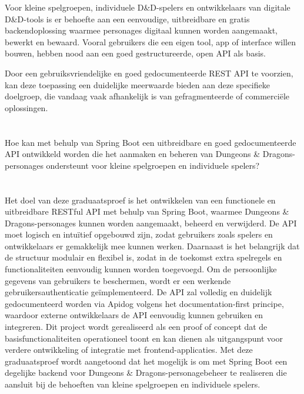 Voor kleine spelgroepen, individuele D\&D-spelers en ontwikkelaars van digitale D&D-tools is er behoefte aan een eenvoudige, uitbreidbare en gratis backendoplossing waarmee personages digitaal kunnen worden aangemaakt, bewerkt en bewaard. Vooral gebruikers die een eigen tool, app of interface willen bouwen, hebben nood aan een goed gestructureerde, open API als basis.

Door een gebruiksvriendelijke en goed gedocumenteerde REST API te voorzien, kan deze toepassing een duidelijke meerwaarde bieden aan deze specifieke doelgroep, die vandaag vaak afhankelijk is van gefragmenteerde of commerciële oplossingen.

\section{}%
\label{sec:onderzoeksvraag}

Hoe kan met behulp van Spring Boot een uitbreidbare en goed gedocumenteerde API ontwikkeld worden die het aanmaken en beheren van Dungeons \& Dragons-personages ondersteunt voor kleine spelgroepen en individuele spelers?

\section{}%
\label{sec:onderzoeksdoelstelling}

Het doel van deze graduaatsproef is het ontwikkelen van een functionele en uitbreidbare RESTful API met behulp van Spring Boot, waarmee Dungeons & Dragons-personages kunnen worden aangemaakt, beheerd en verwijderd. De API moet logisch en intuïtief opgebouwd zijn, zodat gebruikers zoals spelers en ontwikkelaars er gemakkelijk mee kunnen werken. Daarnaast is het belangrijk dat de structuur modulair en flexibel is, zodat in de toekomst extra spelregels en functionaliteiten eenvoudig kunnen worden toegevoegd. Om de persoonlijke gegevens van gebruikers te beschermen, wordt er een werkende gebruikersauthenticatie geïmplementeerd. De API zal volledig en duidelijk gedocumenteerd worden via Apidog volgens het documentation-first principe, waardoor externe ontwikkelaars de API eenvoudig kunnen gebruiken en integreren. Dit project wordt gerealiseerd als een proof of concept dat de basisfunctionaliteiten operationeel toont en kan dienen als uitgangspunt voor verdere ontwikkeling of integratie met frontend-applicaties. Met deze graduaatsproef wordt aangetoond dat het mogelijk is om met Spring Boot een degelijke backend voor Dungeons & Dragons-personagebeheer te realiseren die aansluit bij de behoeften van kleine spelgroepen en individuele spelers.

